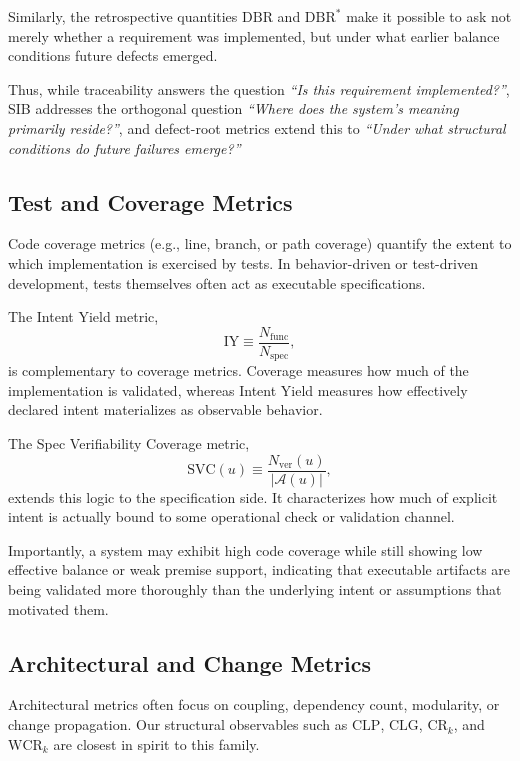 \documentclass[twocolumn]{aastex701}
\begin{document}
Similarly, the retrospective quantities $\mathrm{DBR}$ and $\mathrm{DBR}^\ast$
make it possible to ask not merely whether a requirement was implemented,
but under what earlier balance conditions future defects emerged.

Thus, while traceability answers the question
\emph{``Is this requirement implemented?''},
SIB addresses the orthogonal question
\emph{``Where does the system's meaning primarily reside?''},
and defect-root metrics extend this to
\emph{``Under what structural conditions do future failures emerge?''}

\subsection{Test and Coverage Metrics}

Code coverage metrics (e.g., line, branch, or path coverage) quantify
the extent to which implementation is exercised by tests.
In behavior-driven or test-driven development, tests themselves often act
as executable specifications.

The Intent Yield metric,
\begin{equation}
\mathrm{IY} \equiv \frac{N_{\mathrm{func}}}{N_{\mathrm{spec}}},
\end{equation}
is complementary to coverage metrics.
Coverage measures how much of the implementation is validated,
whereas Intent Yield measures how effectively declared intent
materializes as observable behavior.

The Spec Verifiability Coverage metric,
\begin{equation}
\mathrm{SVC}(u) \equiv
\frac{N_{\mathrm{ver}}(u)}
{|\mathcal{A}(u)|},
\end{equation}
extends this logic to the specification side.
It characterizes how much of explicit intent is actually bound
to some operational check or validation channel.

Importantly, a system may exhibit high code coverage while still showing
low effective balance or weak premise support, indicating that executable
artifacts are being validated more thoroughly than the underlying intent
or assumptions that motivated them.

\subsection{Architectural and Change Metrics}

Architectural metrics often focus on coupling, dependency count,
modularity, or change propagation.
Our structural observables such as $\mathrm{CLP}$, $\mathrm{CLG}$,
$\mathrm{CR}_k$, and $\mathrm{WCR}_k$ are closest in spirit to this family.
\end{document}
